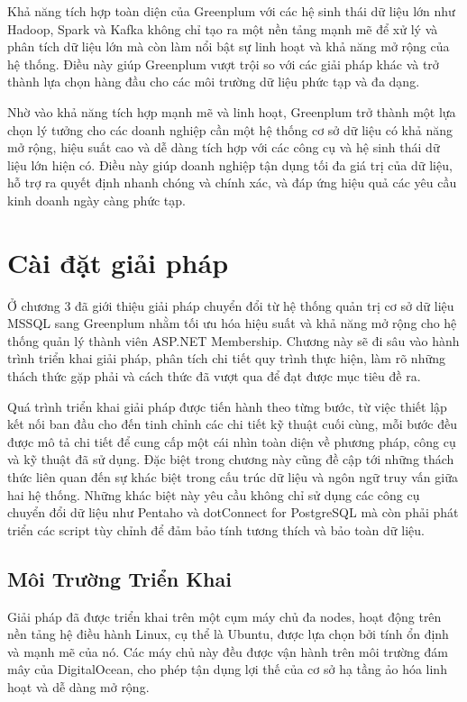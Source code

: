 \documentclass{article}[14pt]
\begin{document}
Khả năng tích hợp toàn diện của Greenplum với các hệ sinh thái dữ liệu lớn như Hadoop, Spark và Kafka không chỉ tạo ra một nền tảng mạnh mẽ để xử lý và phân tích dữ liệu lớn mà còn làm nổi bật sự linh hoạt và khả năng mở rộng của hệ thống. Điều này giúp Greenplum vượt trội so với các giải pháp khác và trở thành lựa chọn hàng đầu cho các môi trường dữ liệu phức tạp và đa dạng.

Nhờ vào khả năng tích hợp mạnh mẽ và linh hoạt, Greenplum trở thành một lựa chọn lý tưởng cho các doanh nghiệp cần một hệ thống cơ sở dữ liệu có khả năng mở rộng, hiệu suất cao và dễ dàng tích hợp với các công cụ và hệ sinh thái dữ liệu lớn hiện có. Điều này giúp doanh nghiệp tận dụng tối đa giá trị của dữ liệu, hỗ trợ ra quyết định nhanh chóng và chính xác, và đáp ứng hiệu quả các yêu cầu kinh doanh ngày càng phức tạp.



\section{Cài đặt giải pháp}

Ở chương 3 đã giới thiệu giải pháp chuyển đổi từ hệ thống quản trị cơ sở dữ liệu MSSQL sang Greenplum nhằm tối ưu hóa hiệu suất và khả năng mở rộng cho hệ thống quản lý thành viên ASP.NET Membership. Chương này sẽ đi sâu vào hành trình triển khai giải pháp, phân tích chi tiết quy trình thực hiện, làm rõ những thách thức gặp phải và cách thức đã vượt qua để đạt được mục tiêu đề ra.

Quá trình triển khai giải pháp được tiến hành theo từng bước, từ việc thiết lập kết nối ban đầu cho đến tinh chỉnh các chi tiết kỹ thuật cuối cùng, mỗi bước đều được mô tả chi tiết để cung cấp một cái nhìn toàn diện về phương pháp, công cụ và kỹ thuật đã sử dụng. Đặc biệt trong chương này cũng đề cập tới những thách thức liên quan đến sự khác biệt trong cấu trúc dữ liệu và ngôn ngữ truy vấn giữa hai hệ thống. Những khác biệt này yêu cầu không chỉ sử dụng các công cụ chuyển đổi dữ liệu như Pentaho và dotConnect for PostgreSQL mà còn phải phát triển các script tùy chỉnh để đảm bảo tính tương thích và bảo toàn dữ liệu.


\subsection{Môi Trường Triển Khai}

Giải pháp đã được triển khai trên một cụm máy chủ đa nodes, hoạt động trên nền tảng hệ điều hành Linux, cụ thể là Ubuntu, được lựa chọn bởi tính ổn định và mạnh mẽ của nó. Các máy chủ này đều được vận hành trên môi trường đám mây của DigitalOcean, cho phép tận dụng lợi thế của cơ sở hạ tầng ảo hóa linh hoạt và dễ dàng mở rộng.
\end{document}
